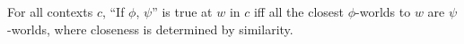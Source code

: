 For all contexts $c$, \enquote{If $\phi$, $\psi$} is true at $w$ in $c$ iff all the closest $\phi$-worlds to $w$ are $\psi$-worlds, where closeness is determined by similarity.%
